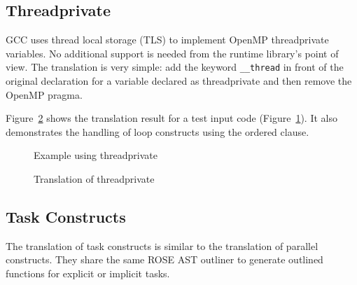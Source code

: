 \clearpage
\subsection{Threadprivate}
GCC uses thread local storage (TLS) to implement OpenMP threadprivate variables. 
No additional support is needed from the runtime library's point of view. 
The translation is very simple: add the keyword \lstinline{__thread} in front of the original declaration for a variable declared as threadprivate and then remove the OpenMP pragma. 

Figure~\ref{Manual:omp:threadprivate-trans} shows the translation result for a test input code (Figure~\ref{Manual:omp:threadprivate}). It also demonstrates the handling of loop constructs using the ordered clause.

\lstset{language=C,basicstyle=\scriptsize}
\begin{figure}[htbp]
{\indent
  {\mySmallFontSize
    \begin{latexonly}
    
    \end{latexonly}
    \begin{htmlonly}
    
    \end{htmlonly}
  }
}
\caption{Example using threadprivate}
\label{Manual:omp:threadprivate}
\end{figure}

\begin{figure}[htbp]
{\indent
  {\mySmallFontSize
    \begin{latexonly}
    
    \end{latexonly}
    \begin{htmlonly}
    
    \end{htmlonly}
  }
}
\caption{Translation of threadprivate}
\label{Manual:omp:threadprivate-trans}
\end{figure}


\clearpage
\subsection{Task Constructs}
The translation of task constructs is similar to the translation of parallel constructs. 
They share the same ROSE AST outliner to generate outlined functions for
explicit or implicit tasks.


